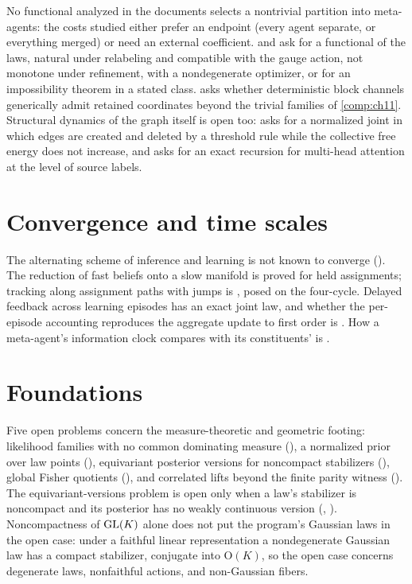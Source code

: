 No functional analyzed in the documents selects a nontrivial partition into meta-agents: the costs
studied either prefer an endpoint (every agent separate, or everything merged) or need an external
coefficient.  and  ask for a
functional of the laws, natural under relabeling and compatible with the gauge action, not monotone
under refinement, with a nondegenerate optimizer, or for an impossibility theorem in a stated class.
 asks whether deterministic block channels generically admit
retained coordinates beyond the trivial families of \cref{comp:ch11}. Structural dynamics of the graph
itself is open too:  asks for a normalized joint in which edges are created
and deleted by a threshold rule while the collective free energy does not increase, and
 asks for an exact recursion for multi-head attention at the level of
source labels.

\section*{Convergence and time scales}

The alternating scheme of inference and learning is not known to converge
(). The reduction of fast beliefs onto a slow manifold is proved
for held assignments; tracking along assignment paths with jumps is ,
posed on the four-cycle. Delayed feedback across learning episodes has an exact joint law, and whether
the per-episode accounting reproduces the aggregate update to first order is
. How a meta-agent's information clock compares with its
constituents' is .

\section*{Foundations}

Five open problems concern the measure-theoretic and geometric footing: likelihood families with no
common dominating measure (), a normalized prior over law points
(), equivariant posterior versions for noncompact stabilizers
(), global Fisher quotients (),
and correlated lifts beyond the finite parity witness (). The
equivariant-versions problem is open only when a law's stabilizer is noncompact and its posterior has
no weakly continuous version (,
). Noncompactness of $\mathrm{GL}(K)$ alone does not put the
program's Gaussian laws in the open case: under a faithful linear representation a nondegenerate
Gaussian law has a compact stabilizer, conjugate into $\mathrm O(K)$, so the open case concerns
degenerate laws, nonfaithful actions, and non-Gaussian fibers.


